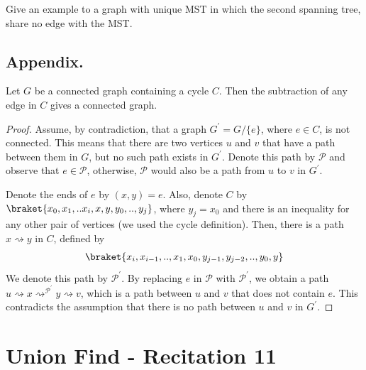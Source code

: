 \begin{problem}
  Give an example to a graph with unique MST in which the second spanning tree, share no edge with the MST. 
\end{problem}

\section{Appendix.}

\begin{claim}
  \label{claim:subtract}
  Let $G$ be a connected graph containing a cycle $C$. Then the subtraction of any edge in $C$ gives a connected graph. 
\end{claim}
\begin{proof}
Assume, by contradiction, that a graph $G^{\prime} = G / \{ e \} $, where $e \in C$, is not connected. This means that there are two vertices $u$ and $v$ that have a path between them in $G$, but no such path exists in $G^{\prime}$. Denote this path by $\mathcal{P}$ and observe that $e \in \mathcal{P}$, otherwise, $\mathcal{P}$ would also be a path from $u$ to $v$ in $G^{\prime}$.

Denote the ends of $e$ by $(x,y)=e$. Also, denote $C$ by $\braket{x_{0},x_{1},..x_{i},x,y,y_{0},..,y_{j}}$, where $y_{j}=x_{0}$ and there is an inequality for any other pair of vertices (we used the cycle definition). Then, there is a path $x \rightsquigarrow y$ in $C$, defined by 
\begin{equation*}
  \begin{split}
\braket{x_{i},x_{i-1},..,x_{1},x_{0},y_{j-1},y_{j-2},..,y_{0},y}
  \end{split}
\end{equation*}
 We denote this path by $\mathcal{P}^{\prime}$. By replacing $e$ in $\mathcal{P}$ with $\mathcal{P}^{\prime}$, we obtain a path $u \rightsquigarrow x \rightsquigarrow^{\mathcal{P}^\prime} y \rightsquigarrow v$, which is a path between $u$ and $v$ that does not contain $e$. This contradicts the assumption that there is no path between $u$ and $v$ in $G^{\prime}$.
\end{proof}






\chapter{Union Find - Recitation 11} 

\usetikzlibrary{positioning, arrows}

